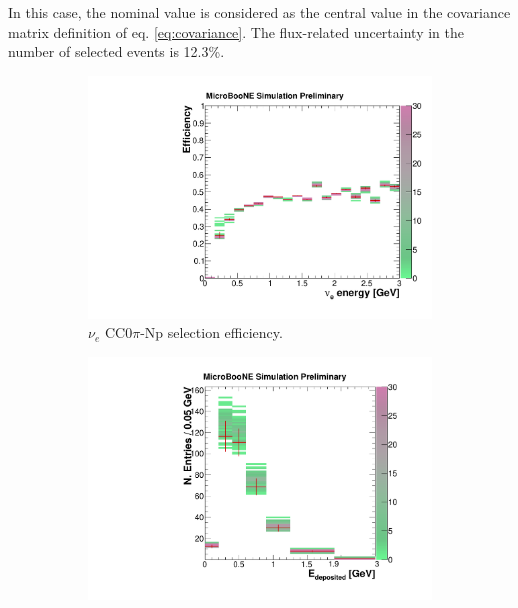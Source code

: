 In this case, the nominal value is considered as the central value in the covariance matrix definition of eq. \eqref{eq:covariance}.
The flux-related uncertainty in the number of selected events is 12.3\%.

\begin{figure}[htbp]
  \begin{center}
    \begin{subfigure}{0.48\textwidth}
      \includegraphics[width=\linewidth]{figures/eff_ene_flux.pdf}
      \caption{$\nu_{e}$ CC0$\pi$-Np selection efficiency.}  \label{fig:eff_flux}
    \end{subfigure}\hfill
    \begin{subfigure}{0.48\textwidth}
      \vspace{0.5em}
      \includegraphics[width=\linewidth]{figures/reco_flux.pdf}

\end{subfigure}
\end{center}
\end{figure}
